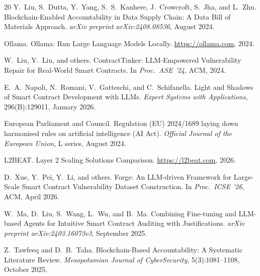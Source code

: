 \documentclass[manuscript,nonacm]{acmart}
\begin{document}
\begin{thebibliography}{20}
Y.~Liu, S.~Dutta, Y.~Yang, S.~S.~Kanhere, J.~Crowcroft, S.~Jha, and L.~Zhu.
\newblock Blockchain-Enabled Accountability in Data Supply Chain: A Data Bill of Materials Approach.
\newblock \emph{arXiv preprint arXiv:2408.08536}, August 2024.

Ollama.
\newblock Ollama: Run Large Language Models Locally.
\newblock \url{https://ollama.com}, 2024.

W.~Liu, Y.~Liu, and others.
\newblock ContractTinker: LLM-Empowered Vulnerability Repair for Real-World Smart Contracts.
\newblock In \emph{Proc.\ ASE '24}, ACM, 2024.

E.~A.~Napoli, N.~Romani, V.~Gatteschi, and C.~Schifanella.
\newblock Light and Shadows of Smart Contract Development with LLMs.
\newblock \emph{Expert Systems with Applications}, 296(B):129011, January 2026.

European Parliament and Council.
\newblock Regulation (EU) 2024/1689 laying down harmonised rules on artificial intelligence (AI Act).
\newblock \emph{Official Journal of the European Union}, L series, August 2024.

L2BEAT.
\newblock Layer 2 Scaling Solutions Comparison.
\newblock \url{https://l2beat.com}, 2026.

D.~Xue, Y.~Pei, Y.~Li, and others.
\newblock Forge: An LLM-driven Framework for Large-Scale Smart Contract Vulnerability Dataset Construction.
\newblock In \emph{Proc.\ ICSE '26}, ACM, April 2026.

W.~Ma, D.~Liu, S.~Wang, L.~Wu, and B.~Ma.
\newblock Combining Fine-tuning and LLM-based Agents for Intuitive Smart Contract Auditing with Justifications.
\newblock \emph{arXiv preprint arXiv:2403.16073v3}, September 2025.

Z.~Tawfeeq and D.~B.~Taha.
\newblock Blockchain-Based Accountability: A Systematic Literature Review.
\newblock \emph{Mesopotamian Journal of CyberSecurity}, 5(3):1081--1108, October 2025.

\end{thebibliography}
\end{document}
